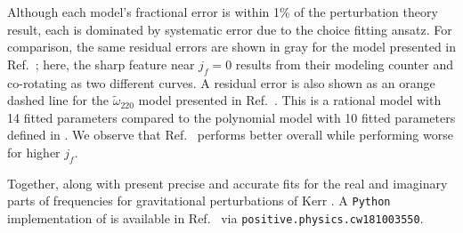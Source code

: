 \documentclass[twocolumn,aps,prd,floatfix,preprintnumbers,a4paper,nofootinbib,
superscriptaddress,10pt]{revtex4-1}
\newcommand{\cw}{\tilde{\omega}}
\def\jf{j_f}
\begin{document}
%
Although each model's fractional error is within 1\% of the perturbation theory result, each is dominated by systematic error due to the choice fitting ansatz.
%
For comparison, the same residual errors are shown in gray for the model presented in Ref.~\cite{Berti:2005ys};
%
here, the sharp feature near $\jf=0$ results from their modeling counter and co-rotating \qnm{} as two different curves. A residual error is also shown as an orange dashed line for the $\cw_{220}$ model presented in Ref.~\cite{Nagar:2018zoe}. This is a rational model with 14 fitted parameters compared to the polynomial model with 10 fitted parameters defined in . We observe that Ref.~\cite{Nagar:2018zoe} performs better overall while performing worse for higher $\jf$.
%
\par Together,  along with  present precise and accurate fits for the real and imaginary parts of \qnm{} frequencies for gravitational perturbations of Kerr .
%
A \texttt{Python} implementation of  is available in Ref.~\cite{lionel_london_2018_1402516} via \texttt{positive.physics.cw181003550}.
%
%
\end{document}
